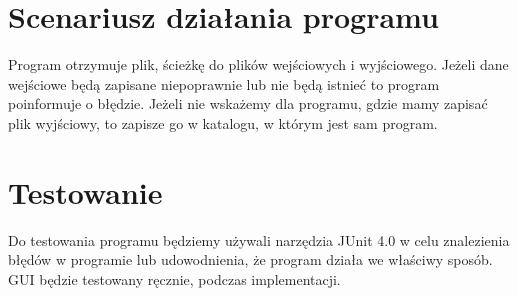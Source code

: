 ﻿\documentclass{article}
\begin{document}
\section{Scenariusz dzia{\l}ania programu}

\noindent Program otrzymuje plik, \'{s}cie\.{z}k\k{e} do plik\'{o}w wej\'{s}ciowych i wyj\'{s}ciowego. Je\.{z}eli dane wej\'{s}ciowe b\k{e}d\k{a} zapisane niepoprawnie lub nie b\k{e}d\k{a} istnie\'{c} to program poinformuje o b{\l}\k{e}dzie. Je\.{z}eli nie wska\.{z}emy dla programu, gdzie mamy zapisa\'{c} plik wyj\'{s}ciowy, to zapisze go w katalogu, w kt\'{o}rym jest sam program.

\noindent 
\section{Testowanie}

\noindent Do testowania programu b\k{e}dziemy u\.{z}ywali narz\k{e}dzia JUnit 4.0 w celu znalezienia b{\l}\k{e}d\'{o}w w programie lub udowodnienia, \.{z}e program dzia{\l}a we w{\l}a\'{s}ciwy spos\'{o}b. GUI b\k{e}dzie testowany r\k{e}cznie, podczas implementacji.
\end{document}
